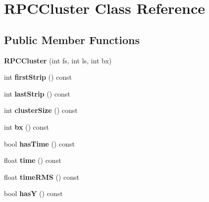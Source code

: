 \hypertarget{classRPCCluster}{\section{R\-P\-C\-Cluster Class Reference}
\label{classRPCCluster}
}
\subsection*{Public Member Functions}
\begin{DoxyCompactItemize}
\item 
\hypertarget{classRPCCluster_a19facd34e0d73d84a5bb409e454c1459}{{\bfseries R\-P\-C\-Cluster} (int fs, int ls, int bx)}\label{classRPCCluster_a19facd34e0d73d84a5bb409e454c1459}

\item 
\hypertarget{classRPCCluster_aed16a1f111d0f66b453bb52501216833}{int {\bfseries first\-Strip} () const }\label{classRPCCluster_aed16a1f111d0f66b453bb52501216833}

\item 
\hypertarget{classRPCCluster_ad95330d1ecc1256b39610f0e50ae90b7}{int {\bfseries last\-Strip} () const }\label{classRPCCluster_ad95330d1ecc1256b39610f0e50ae90b7}

\item 
\hypertarget{classRPCCluster_a7b7d05ba30d32ccf62a1b36379796811}{int {\bfseries cluster\-Size} () const }\label{classRPCCluster_a7b7d05ba30d32ccf62a1b36379796811}

\item 
\hypertarget{classRPCCluster_aafde61eea089ac3e45435b7fdb785653}{int {\bfseries bx} () const }\label{classRPCCluster_aafde61eea089ac3e45435b7fdb785653}

\item 
\hypertarget{classRPCCluster_a556c1b83c8df2549b7b79e0c2d6aea4d}{bool {\bfseries has\-Time} () const }\label{classRPCCluster_a556c1b83c8df2549b7b79e0c2d6aea4d}

\item 
\hypertarget{classRPCCluster_a70d6e449ca2267fe4ef80e74cbc64d3c}{float {\bfseries time} () const }\label{classRPCCluster_a70d6e449ca2267fe4ef80e74cbc64d3c}

\item 
\hypertarget{classRPCCluster_a0a96aa7d21f2909842d02bd9d1102146}{float {\bfseries time\-R\-M\-S} () const }\label{classRPCCluster_a0a96aa7d21f2909842d02bd9d1102146}

\item 
\hypertarget{classRPCCluster_a955a08ee7eff8646a0331c21449f90af}{bool {\bfseries has\-Y} () const }\label{classRPCCluster_a955a08ee7eff8646a0331c21449f90af}


\end{DoxyCompactItemize}
